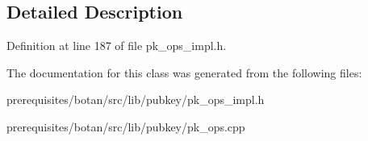 \subsection{Detailed Description}


Definition at line 187 of file pk\+\_\+ops\+\_\+impl.\+h.



The documentation for this class was generated from the following files\+:\begin{DoxyCompactItemize}
\item 
prerequisites/botan/src/lib/pubkey/pk\+\_\+ops\+\_\+impl.\+h\item 
prerequisites/botan/src/lib/pubkey/pk\+\_\+ops.\+cpp\end{DoxyCompactItemize}
